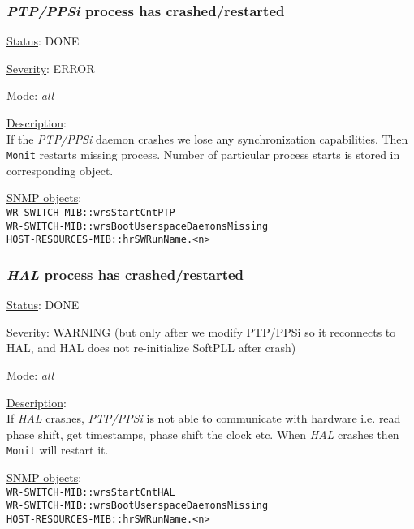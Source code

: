 \subsubsection{\bf \emph{PTP/PPSi} process has crashed/restarted}
		\label{fail:timing:ppsi_crash}
		\begin{packed_enum}
			\item [] \underline{Status}: DONE
			\item [] \underline{Severity}: ERROR
			\item [] \underline{Mode}: \emph{all}
			\item [] \underline{Description}:\\
				If the \emph{PTP/PPSi} daemon crashes we lose any synchronization
				capabilities. Then \texttt{Monit} restarts missing process.
				Number of particular process starts is stored in corresponding object.
			\item [] \underline{SNMP objects}:\\
				\texttt{WR-SWITCH-MIB::wrsStartCntPTP}\\
				\texttt{WR-SWITCH-MIB::wrsBootUserspaceDaemonsMissing}\\
				\texttt{HOST-RESOURCES-MIB::hrSWRunName.<n>}
		\end{packed_enum}

\subsubsection{\bf \emph{HAL} process has crashed/restarted}
		\label{fail:timing:hal_crash}
		\begin{packed_enum}
			\item [] \underline{Status}: DONE
			\item [] \underline{Severity}: WARNING (but only after we modify PTP/PPSi so
				it reconnects to HAL, and HAL does not re-initialize SoftPLL after
				crash)
			\item [] \underline{Mode}: \emph{all}
			\item [] \underline{Description}:\\
				If \emph{HAL} crashes, \emph{PTP/PPSi} is not able to communicate with
				hardware i.e. read phase shift, get timestamps, phase shift the clock
				etc. When \emph{HAL} crashes then \texttt{Monit} will restart it.
			\item [] \underline{SNMP objects}:\\
				\texttt{WR-SWITCH-MIB::wrsStartCntHAL}\\
				\texttt{WR-SWITCH-MIB::wrsBootUserspaceDaemonsMissing}\\
				\texttt{HOST-RESOURCES-MIB::hrSWRunName.<n>}
		\end{packed_enum}

